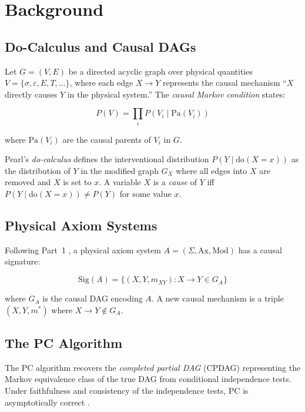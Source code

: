 \documentclass[twoside,11pt]{article}
\newcommand{\doOp}{\mathrm{do}}
\newcommand{\Sig}{\mathrm{Sig}}
\newcommand{\PA}{\mathrm{Pa}}
\begin{document}
\section{Background}
\label{sec:background}

\subsection{Do-Calculus and Causal DAGs}

Let $G = (V, E)$ be a directed acyclic graph over physical quantities
$V = \{\sigma, \varepsilon, E, T, \ldots\}$, where each edge $X \to Y$
represents the causal mechanism ``$X$ directly causes $Y$ in the
physical system.'' The \emph{causal Markov condition} states:

\begin{equation}
  P(V) = \prod_{i} P(V_i \mid \PA(V_i))
  \label{eq:markov}
\end{equation}

where $\PA(V_i)$ are the causal parents of $V_i$ in $G$.

Pearl's \emph{do-calculus} \citep{pearl2009causality} defines the
interventional distribution $P(Y \mid \doOp(X{=}x))$ as the
distribution of $Y$ in the modified graph $G_{X}$ where all edges
into $X$ are removed and $X$ is set to $x$. A variable $X$ is a
\emph{cause} of $Y$ iff $P(Y \mid \doOp(X{=}x)) \neq P(Y)$ for some
value $x$.

\subsection{Physical Axiom Systems}

Following Part~1 \citep{forgwm2026part1}, a physical axiom system
$A = (\Sigma, \mathrm{Ax}, \mathrm{Mod})$ has a causal signature:

\begin{equation}
  \Sig(A) = \{(X, Y, m_{XY}) : X \to Y \in G_A\}
  \label{eq:sig}
\end{equation}

where $G_A$ is the causal DAG encoding $A$. A new causal mechanism is
a triple $(X, Y, m^*)$ where $X \to Y \notin G_A$.

\subsection{The PC Algorithm}

The PC algorithm \citep{spirtes2000causation} recovers the
\emph{completed partial DAG} (CPDAG) representing the Markov
equivalence class of the true DAG from conditional independence
tests. Under faithfulness and consistency of the independence tests,
PC is asymptotically correct \citep{kalisch2007estimating}.
\end{document}
